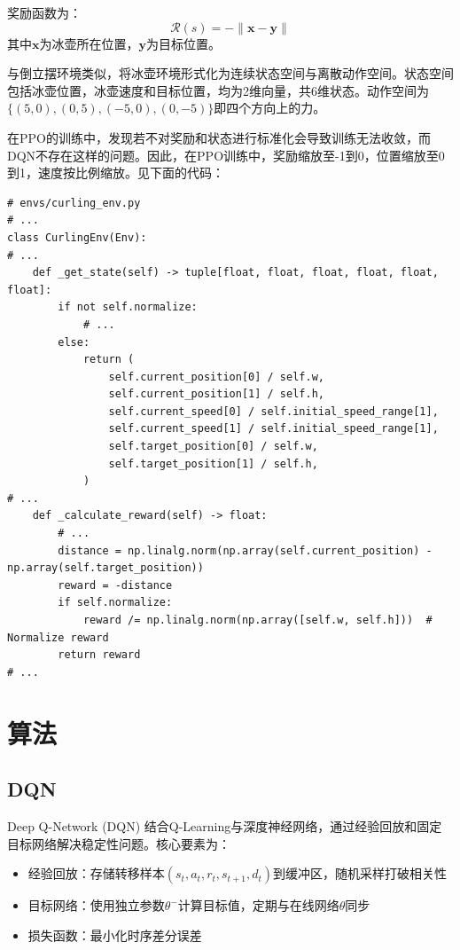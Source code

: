 \documentclass[12pt,a4paper]{article}
\begin{document}
奖励函数为：
\begin{equation}
    \mathcal{R}(s)=-\|\mathbf{x}-\mathbf{y}\|
\end{equation}
其中$\mathbf{x}$为冰壶所在位置，$\mathbf{y}$为目标位置。

与倒立摆环境类似，将冰壶环境形式化为连续状态空间与离散动作空间。状态空间包括冰壶位置，冰壶速度和目标位置，均为2维向量，共6维状态。动作空间为$\{(5,0),(0,5),(-5,0),(0,-5)\}$即四个方向上的力。

在PPO的训练中，发现若不对奖励和状态进行标准化会导致训练无法收敛，而DQN不存在这样的问题。因此，在PPO训练中，奖励缩放至-1到0，位置缩放至0到1，速度按比例缩放。见下面的代码：
\begin{lstlisting}
# envs/curling_env.py
# ...
class CurlingEnv(Env):
# ...
    def _get_state(self) -> tuple[float, float, float, float, float, float]:
        if not self.normalize:
            # ...
        else:
            return (
                self.current_position[0] / self.w,
                self.current_position[1] / self.h,
                self.current_speed[0] / self.initial_speed_range[1],
                self.current_speed[1] / self.initial_speed_range[1],
                self.target_position[0] / self.w,
                self.target_position[1] / self.h,
            )
# ...
    def _calculate_reward(self) -> float:
        # ...
        distance = np.linalg.norm(np.array(self.current_position) - np.array(self.target_position))
        reward = -distance
        if self.normalize:
            reward /= np.linalg.norm(np.array([self.w, self.h]))  # Normalize reward
        return reward
# ...
\end{lstlisting}

\section{算法}
\label{sec:algo}

\subsection{DQN}
Deep Q-Network (DQN) 结合Q-Learning与深度神经网络，通过经验回放和固定目标网络解决稳定性问题。核心要素为：

\begin{itemize}
    \item 经验回放：存储转移样本$(s_t,a_t,r_t,s_{t+1},d_t)$到缓冲区，随机采样打破相关性
    \item 目标网络：使用独立参数$\theta^-$计算目标值，定期与在线网络$\theta$同步
    \item 损失函数：最小化时序差分误差
\end{itemize}
\end{document}
